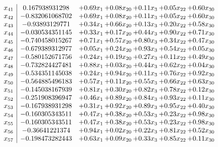 \documentclass[8pt]{article}
\begin{document}
\[\begin{array}{c| c c@{\hskip 2pt} c@{\hskip 2pt} c@{\hskip 2pt} c@{\hskip 2pt} c@{\hskip 2pt} }
 x_{41}   &  0.167938931298 & +  0.69 x_{1} & +  0.08 x_{20} & +  0.11 x_{3} & +  0.05 x_{22} & +  0.60 x_{30}\\
 x_{42}   &  -0.832061068702 & +  0.69 x_{1} & +  0.08 x_{20} & +  0.11 x_{3} & +  0.05 x_{22} & +  0.60 x_{30}\\
 x_{43}   &  -0.93893129771 & +  0.34 x_{1} & +  0.66 x_{20} & +  0.13 x_{3} & +  0.20 x_{22} & +  0.58 x_{30}\\
 x_{44}   &  -0.030534351145 & +  0.33 x_{1} & +  0.17 x_{20} & +  0.44 x_{3} & +  0.90 x_{22} & +  0.71 x_{30}\\
 x_{45}   &  -0.740458015267 & +  0.71 x_{1} & +  0.57 x_{20} & +  0.80 x_{3} & +  0.34 x_{22} & +  0.47 x_{30}\\
 x_{46}   &  -0.679389312977 & +  0.05 x_{1} & +  0.24 x_{20} & +  0.93 x_{3} & +  0.54 x_{22} & +  0.05 x_{30}\\
 x_{47}   &  -0.580152671756 & +  0.24 x_{1} & +  0.19 x_{20} & +  0.27 x_{3} & +  0.11 x_{22} & +  0.49 x_{30}\\
 x_{48}   &  -0.732824427481 & +  0.88 x_{1} & +  0.03 x_{20} & +  0.44 x_{3} & +  0.62 x_{22} & +  0.04 x_{30}\\
 x_{49}   &  -0.534351145038 & +  0.24 x_{1} & +  0.94 x_{20} & +  0.11 x_{3} & +  0.76 x_{22} & +  0.92 x_{30}\\
 x_{50}   &  -0.564885496183 & +  0.57 x_{1} & +  0.11 x_{20} & +  0.55 x_{3} & +  0.66 x_{22} & +  0.63 x_{30}\\
 x_{51}   &  -0.145038167939 & +  0.81 x_{1} & +  0.30 x_{20} & +  0.82 x_{3} & +  0.78 x_{22} & +  0.12 x_{30}\\
 x_{52}   &  -0.251908396947 & +  0.46 x_{1} & +  0.89 x_{20} & +  0.84 x_{3} & +  0.93 x_{22} & +  0.11 x_{30}\\
 x_{53}   &  -0.167938931298 & +  0.31 x_{1} & +  0.92 x_{20} & +  0.89 x_{3} & +  0.95 x_{22} & +  0.40 x_{30}\\
 x_{54}   &  -0.160305343511 & +  0.47 x_{1} & +  0.38 x_{20} & +  0.53 x_{3} & +  0.23 x_{22} & +  0.98 x_{30}\\
 x_{55}   &  -0.160305343511 & +  0.47 x_{1} & +  0.38 x_{20} & +  0.53 x_{3} & +  0.23 x_{22} & +  0.98 x_{30}\\
 x_{56}   &  -0.36641221374 & +  0.94 x_{1} & +  0.02 x_{20} & +  0.22 x_{3} & +  0.81 x_{22} & +  0.52 x_{30}\\
 x_{57}   &  -0.198473282443 & +  0.63 x_{1} & +  0.09 x_{20} & +  0.33 x_{3} & +  0.85 x_{22} & +  0.11 x_{30}\\

\end{array}\]
\end{document}
